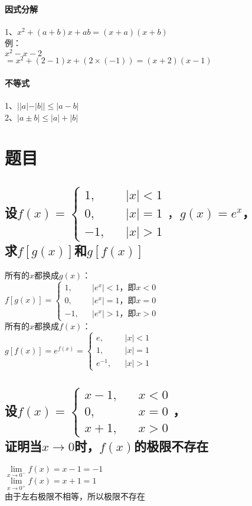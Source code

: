\documentclass{article}
\begin{document}
\begin{flushleft}
\paragraph{因式分解}
1、$x^2+(a+b)x+ab=(x+a)(x+b)$\\
例：\\
\qquad $x^2-x-2$\\
\qquad $=x^2+(2-1)x+(2\times(-1))=(x+2)(x-1)$\\

\paragraph{不等式}
1、$||a|-|b||\le |a-b|$\\
2、$|a\pm b|\le |a|+|b|$\\


\section{题目}

\subsection{
设$f(x)=\left\{
\begin{array}{rcl}
1,& & |x|<1\\
0,& & |x|=1\\
-1,& & |x|>1
\end{array} \right.，g(x)=e^x$，\\
求$f[g(x)]$和$g[f(x)]$
}
所有的$x$都换成$g(x)$：\\
$f[g(x)]=\left\{
\begin{array}{rcl}
1,& & |e^x|<1，\mbox{即}x<0\\
0,& & |e^x|=1，\mbox{即}x=0\\
-1,& & |e^x|>1，\mbox{即}x>0
\end{array} \right.$\\
所有的$x$都换成$f(x)$：\\
$g[f(x)]=e^{f(x)}=\left\{
\begin{array}{rcl}
e,& & |x|<1\\
1,& & |x|=1\\
e^{-1},& & |x|>1
\end{array} \right.$\\

\subsection{
设$f(x)=\left\{
\begin{array}{rcl}
x-1,& & x<0\\
0,& & x=0\\
x+1,& & x>0
\end{array} \right.$，\\
证明当$x\to 0$时，$f(x)$的极限不存在
}
$\lim\limits_{x\to 0^-}f(x)=x-1=-1$\\
$\lim\limits_{x\to 0^+}f(x)=x+1=1$\\
由于左右极限不相等，所以极限不存在\\


\end{flushleft}
\end{document}
